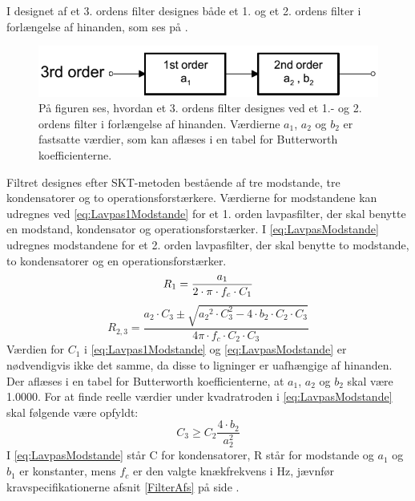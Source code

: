 I designet af et 3. ordens filter designes både et 1. og et 2. ordens filter i forlængelse af hinanden, som ses på .
\begin{figure}[H]
	\centering
	\includegraphics[scale=1]{figures/cProblemloesning/Filter_Orden.PNG}
	\caption{På figuren ses, hvordan et 3. ordens filter designes ved et 1.- og 2. ordens filter i forlængelse af hinanden. Værdierne $a_{1}$, $a_{2}$ og $b_{2}$ er fastsatte værdier, som kan aflæses i en tabel for Butterworth koefficienterne. \cite{Carter2013}}
	\label{fig:filter_Orden}
\end{figure}
\noindent Filtret designes efter SKT-metoden bestående af tre modstande, tre kondensatorer og to operationsforstærkere. Værdierne for modstandene kan udregnes ved \eqref{eq:Lavpas1Modstande} for et 1. orden lavpasfilter, der skal benytte en modstand, kondensator og operationsforstærker. I \eqref{eq:LavpasModstande} udregnes modstandene for et  2. orden lavpasfilter, der skal benytte to modstande, to kondensatorer og en operationsforstærker. \cite{Carter2013}
\begin{equation} \label{eq:Lavpas1Modstande}
R_{1} = \frac{a_1}{2 \cdot \pi \cdot f_c \cdot C_1} \\
\end{equation}
\begin{equation}
 \label{eq:LavpasModstande}
R_{2,3} = \frac{a_2 \cdot C_3 \pm \sqrt{{a_2}^2 \cdot C_3^2 - 4 \cdot b_2 \cdot C_2 \cdot C_3}}{4 \pi \cdot f_c \cdot C_2 \cdot C_3}
\end{equation}
\noindent Værdien for $C_{1}$ i \eqref{eq:Lavpas1Modstande} og \eqref{eq:LavpasModstande} er nødvendigvis ikke det samme, da disse to ligninger er uafhængige af hinanden. Der aflæses i en tabel for Butterworth koefficienterne, at $a_{1}$, $a_{2}$ og $b_{2}$ skal være 1.0000. For at finde reelle værdier under kvadratroden i \eqref{eq:LavpasModstande} skal følgende være opfyldt:
\begin{equation} \label{eq:kondensator}
C_3 \geq C_2 \frac{4 \cdot b_2}{a_2^2}
\end{equation}
I \eqref{eq:LavpasModstande} står C for kondensatorer, R står for modstande og $a_1$ og $b_1$ er konstanter, mens $f_c$ er den valgte knækfrekvens i Hz, jævnfør kravspecifikationerne afsnit \ref{FilterAfs} på side \pageref{FilterAfs}. 

